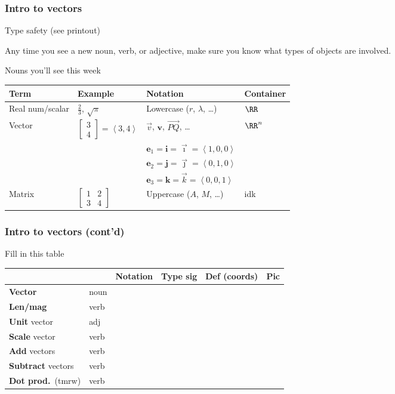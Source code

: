 \documentclass[11pt]{beamer}
\begin{document}
\begin{frame}
  \frametitle{Intro to vectors}
  \begin{alertblock}{Type safety (see printout)}
  \begin{itemize}
    \ii Any time you see a new noun, verb, or adjective,
    make sure you know what \alert{types} of objects are involved.
  \end{itemize}
  \end{alertblock}
  \begin{exampleblock}{Nouns you'll see this week}
    \begin{tabular}{llll}
      Term & Example & Notation & Container \\\hline
      Real num/scalar & $\frac23$, $\sqrt\pi$ & Lowercase ($r$, $\lambda$, \dots) & $\RR$ \\
      Vector & $\begin{bmatrix} 3 \\ 4 \end{bmatrix} = \left< 3,4 \right>$
             & $\vec v$, $\mathbf{v}$, $\overrightarrow{PQ}$, \dots & $\RR^n$ \\
             && $\mathbf{e}_1 = \mathbf{i} = \vec{\imath} = \left< 1,0,0 \right>$ \\
             && $\mathbf{e}_2 = \mathbf{j} = \vec{\jmath} = \left< 0,1,0 \right>$ \\
             && $\mathbf{e}_3 = \mathbf{k} = \vec{k} = \left< 0,0,1 \right>$ \\
      Matrix & $\begin{bmatrix} 1 & 2 \\ 3 & 4 \end{bmatrix}$ & Uppercase ($A$, $M$, \dots)
             & idk
    \end{tabular}
  \end{exampleblock}
\end{frame}

\begin{frame}
  \frametitle{Intro to vectors (cont'd)}
  \begin{block}{Fill in this table}
  \begin{tabular}{llllll}
    & & Notation & Type sig & Def (coords) & Pic \\ \hline
    \textbf{Vector} & noun \\
    \textbf{Len/mag} & verb \\
    \textbf{Unit} vector & adj \\
    \textbf{Scale} vector & verb \\
    \textbf{Add} vectors & verb \\
    \textbf{Subtract} vectors & verb \\
    \textbf{Dot prod.}\ (tmrw) & verb \\
  \end{tabular}
  \end{block}
\end{frame}
\end{document}
